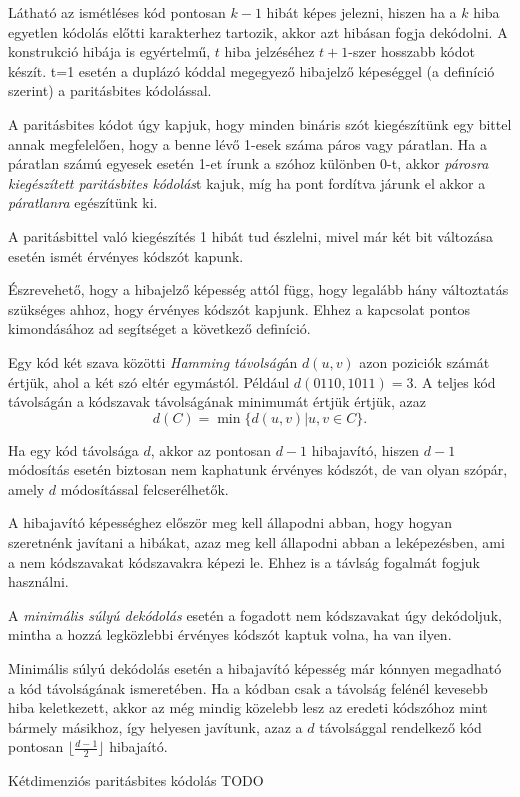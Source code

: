 Látható az ismétléses kód pontosan $k-1$ hibát képes jelezni, hiszen ha a $k$ hiba egyetlen
kódolás előtti karakterhez tartozik, akkor azt hibásan fogja dekódolni. A konstrukció hibája
is egyértelmű, $t$ hiba jelzéséhez $t+1$-szer hosszabb kódot készít. t=1 esetén a duplázó kóddal
megegyező hibajelző képeséggel (a definíció szerint) a paritásbites kódolással.

\begin{definition}
    A paritásbites kódot úgy kapjuk, hogy minden bináris szót kiegészítünk egy bittel annak
    megfelelően, hogy a benne lévő 1-esek száma páros vagy páratlan. Ha a páratlan számú egyesek
    esetén 1-et írunk a szóhoz különben 0-t, akkor \emph{párosra kiegészített paritásbites
    kódolás}t kajuk, míg ha pont fordítva járunk el akkor a \emph{páratlanra} egészítünk ki.
\end{definition}

A paritásbittel való kiegészítés 1 hibát tud észlelni, mivel már két bit változása esetén ismét
érvényes kódszót kapunk.

Észrevehető, hogy a hibajelző képesség attól függ, hogy legalább hány változtatás szükséges ahhoz,
hogy érvényes kódszót kapjunk. Ehhez a kapcsolat pontos kimondásához ad segítséget a következő
definíció.

\begin{definition}
    Egy kód két szava közötti \emph{Hamming távolság}án $d(u,v)$ azon poziciók számát értjük, ahol a
    két szó eltér egymástól. Például $d(0110,1011) = 3$. A teljes kód távolságán a kódszavak
    távolságának minimumát értjük értjük, azaz \[ d(C)= \min\{d(u,v)|u,v\in C\}.\]
\end{definition}

Ha egy kód távolsága $d$, akkor az pontosan $d-1$ hibajavító, hiszen $d-1$ módosítás esetén biztosan
nem kaphatunk érvényes kódszót, de van olyan szópár, amely $d$ módosítással felcserélhetők.

A hibajavító képességhez először meg kell állapodni abban, hogy hogyan szeretnénk javítani a
hibákat, azaz meg kell állapodni abban a leképezésben, ami a nem kódszavakat kódszavakra képezi le.
Ehhez is a távlság fogalmát fogjuk használni.

\begin{definition}
    A \emph{minimális súlyú dekódolás} esetén a fogadott nem kódszavakat úgy dekódoljuk, mintha a
    hozzá legközlebbi érvényes kódszót kaptuk volna, ha van ilyen.
\end{definition}

Minimális súlyú dekódolás esetén a hibajavító képesség már kónnyen megadható a kód távolságának
ismeretében. Ha a kódban csak a távolság felénél kevesebb hiba keletkezett, akkor az még mindig
közelebb lesz az eredeti kódszóhoz mint bármely másikhoz, így helyesen javítunk, azaz a $d$
távolsággal rendelkező kód pontosan $\lfloor\frac{d-1}{2}\rfloor$ hibajaító.

\begin{definition}{Kétdimenziós paritásbites kódolás}
    TODO
\end{definition}

